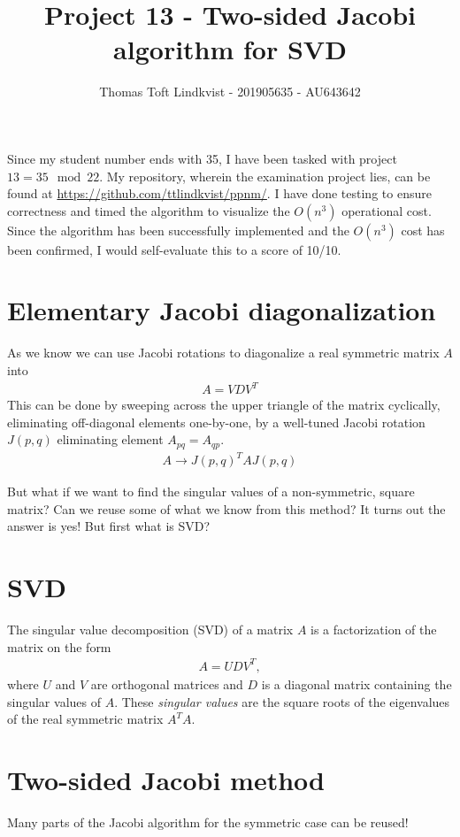 \documentclass{article}
\title{Project 13 - Two-sided Jacobi algorithm for SVD}
\author{Thomas Toft Lindkvist - 201905635 - AU643642}
\date{}
\begin{document}
    \maketitle
    \noindent
    Since my student number ends with 35, I have been tasked with project $13 = 35 \mod 22 $.
    My repository, wherein the examination project lies, can be found at \url{https://github.com/ttlindkvist/ppnm/}.
    I have done testing to ensure correctness and timed the algorithm to visualize the $ O(n^3) $ operational cost. Since the algorithm has been successfully implemented and the $ O(n^3) $ cost has been confirmed, I would self-evaluate this to a score of 10/10.
    
    \section{Elementary Jacobi diagonalization}
    As we know we can use Jacobi rotations to diagonalize a real symmetric matrix $ A $ into
    \begin{align}
    	A = VDV^T
    \end{align}
	This can be done by sweeping across the upper triangle of the matrix cyclically, eliminating off-diagonal elements one-by-one, by a well-tuned Jacobi rotation $ J(p,q) $ eliminating element $ A_{pq}=A_{qp} $.
	\begin{align}
		A \to J(p,q)^T A J(p,q)
	\end{align}
	
	But what if we want to find the singular values of a non-symmetric, square matrix? Can we reuse some of what we know from this method? It turns out the answer is yes! But first what is SVD?
	
	\section{SVD}
	The singular value decomposition (SVD) of a matrix $ A $ is a factorization of the matrix on the form
	\begin{align}
		A = UDV^T,
	\end{align}
	where $ U $ and $ V $ are orthogonal matrices and $ D $ is a diagonal matrix containing the singular values of $ A $. These \textit{singular values} are the square roots of the eigenvalues of the real symmetric matrix $ A^TA $.	
	
    
    \section{Two-sided Jacobi method}
    Many parts of the Jacobi algorithm for the symmetric case can be reused! 
\end{document}
